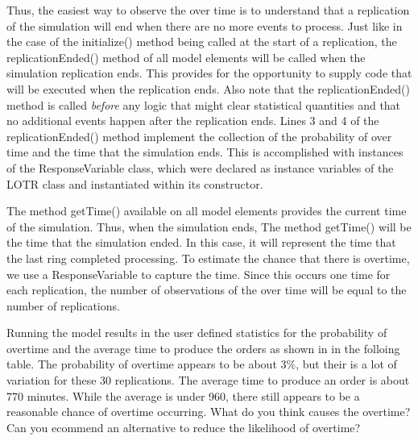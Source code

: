 \documentclass[
]{book}
\theoremstyle{definition}
\theoremstyle{definition}
\theoremstyle{definition}
\theoremstyle{definition}
\theoremstyle{remark}
\begin{document}
Thus, the easiest way to observe the over time is to understand that a
replication of the simulation will end when there are no more events to
process. Just like in the case of the initialize() method being called
at the start of a replication, the replicationEnded() method of all
model elements will be called when the simulation replication ends. This
provides for the opportunity to supply code that will be executed when
the replication ends. Also note that the replicationEnded() method is
called \emph{before} any logic that might clear statistical quantities and
that no additional events happen after the replication ends. Lines 3 and 4 of the
replicationEnded() method implement the collection of the probability
of over time and the time that the simulation ends. This is accomplished
with instances of the ResponseVariable class, which were declared as
instance variables of the LOTR class and instantiated within its
constructor.

The method getTime() available on all model elements provides the
current time of the simulation. Thus, when the simulation ends, The
method getTime() will be the time that the simulation ended. In this
case, it will represent the time that the last ring completed
processing. To estimate the chance that there is overtime, we use a
ResponseVariable to capture the time. Since this occurs one time for
each replication, the number of observations of the over time will be
equal to the number of replications.

Running the model results in the user defined statistics for the
probability of overtime and the average time to produce the orders as
shown in in the folloing table. The probability of overtime appears to be about
3\%, but their is a lot of variation for these 30 replications. The
average time to produce an order is about 770 minutes. While the average
is under 960, there still appears to be a reasonable chance of overtime
occurring. What do you think causes the overtime? Can you ecommend an alternative to reduce the likelihood of overtime?
\end{document}
